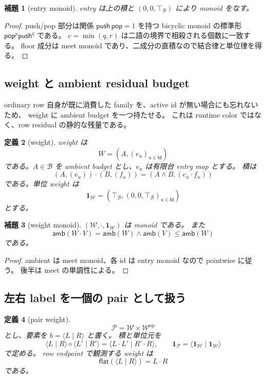 \documentclass[uplatex,dvipdfmx,a4paper,10.5pt]{jsarticle}
\theoremstyle{jpplain}
\newtheorem{definition}{定義}[section]
\newtheorem{lemma}[definition]{補題}
\newcommand{\Caps}{\mathcal B}
\newcommand{\Id}{\mathsf{Id}}
\newcommand{\topc}{\top_{\Caps}}
\newcommand{\meet}{\mathbin{\wedge}}
\newcommand{\Weight}{\mathcal W}
\newcommand{\Pair}{\mathcal P}
\newcommand{\idw}{\mathbf 1_{\Weight}}
\newcommand{\idp}{\mathbf 1_{\Pair}}
\newcommand{\wcomp}{\mathbin{\cdot}}
\newcommand{\pcomp}{\mathbin{\diamond}}
\newcommand{\flatten}{\mathsf{flat}}
\newcommand{\amb}{\mathsf{amb}}
\begin{document}
\begin{lemma}[entry monoid]
entry は上の積と $(0,0,\topc)$ により monoid をなす。
\end{lemma}

\begin{proof}
push/pop 部分は関係 $\mathsf{push}\,\mathsf{pop}=1$ を持つ bicyclic monoid の標準形
$\mathsf{pop}^{p}\mathsf{push}^{q}$ である。
$c=\min(q,r)$ は二語の境界で相殺される個数に一致する。
floor 成分は meet monoid であり、二成分の直積なので結合律と単位律を得る。
\end{proof}

\subsection{weight と ambient residual budget}

ordinary row 自身が既に消費した family を、active id が無い場合にも忘れないため、
weight に ambient budget を一つ持たせる。
これは runtime color ではなく、row residual の静的な残量である。

\begin{definition}[weight]
weight は
\[
  W=(A,(e_u)_{u\in\Id})
\]
である。$A\in\Caps$ を ambient budget とし、$e_u$ は有限台 entry map とする。
積は
\[
  (A,(e_u))\wcomp(B,(f_u))
  =
  (A\meet B,(e_u\wcomp f_u))
\]
である。単位 weight は
\[
  \idw=(\topc,(0,0,\topc)_{u\in\Id})
\]
とする。
\end{definition}

\begin{lemma}[weight monoid]
$(\Weight,\wcomp,\idw)$ は monoid である。
また
\[
  \amb(W\wcomp V)=\amb(W)\meet\amb(V)\leq\amb(W)
\]
である。
\end{lemma}

\begin{proof}
ambient は meet monoid、各 id は entry monoid なので pointwise に従う。
後半は meet の単調性による。
\end{proof}

\subsection{左右 label を一個の pair として扱う}

\begin{definition}[pair weight]
\[
  \Pair=\Weight\times\Weight^{\mathrm{op}}
\]
とし、要素を $b=\langle L\mid R\rangle$ と書く。
積と単位元を
\[
 \langle L\mid R\rangle\pcomp\langle L'\mid R'\rangle
 =\langle L\wcomp L'\mid R'\wcomp R\rangle,
 \qquad
 \idp=\langle\idw\mid\idw\rangle
\]
で定める。
row endpoint で観測する weight は
\[
  \flatten(\langle L\mid R\rangle)=L\wcomp R
\]
である。
\end{definition}
\end{document}
